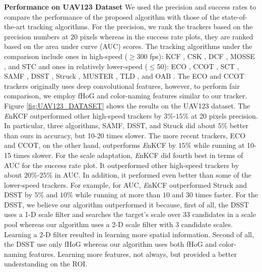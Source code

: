\documentclass[10pt,twocolumn,letterpaper]{article}
\begin{document}
\textbf{Performance on UAV123 Dataset} We used the precision and
success rates to compare the performance of the proposed algorithm
with those of the state-of-the-art tracking algorithms. For the
precision, we rank the trackers based on the precision numbers at 20
pixels whereas in the success rate plots, they are ranked based on the
area under curve (AUC) scores. The tracking algorithms under the
comparison include ones in high-speed ($\geq$300 fps): KCF
\cite{henriques2015high}, CSK \cite{henriques2012exploiting}, DCF
\cite{henriques2015high}, MOSSE \cite{bolme2010visual}, and STC
\cite{zhang2014fast} and ones in relatively lower-speed ($\leq$50):
ECO \cite{DanelljanCVPR2017}, CCOT \cite{DanelljanECCV2016}, SCT
\cite{Choi_2016_CVPR}, SAMF \cite{li2014scale}, DSST
\cite{danelljan2014accurate}, Struck \cite{hare2012efficient}, MUSTER
\cite{hong2015multi}, TLD \cite{kalal2012tracking}, and OAB
\cite{zhang2012robust}. The ECO and CCOT trackers originally uses deep
convolutional features, however, to perform fair comparison, we employ
fHoG and color-naming features similar to our tracker. Figure
\ref{fig:UAV123_DATASET} shows the results on the UAV123 dataset. The
    {\it E}nKCF outperformed other high-speed trackers by $3\%$-$15\%$
    at 20 pixels precision. In particular, three algorithms, SAMF,
    DSST, and Struck did about $5\%$ better than ours in accuracy, but
    10-20 times slower. The more recent trackers, ECO and CCOT, on the
    other hand, outperforms {\it E}nKCF by $15\%$ while running at
    10-15 times slower. For the scale adaptation, {\it E}nKCF did
    fourth best in terms of AUC for the success rate plot. It
    outperformed other high-speed trackers by about $20\%$-$25\%$ in
    AUC. In addition, it performed even better than some of the
    lower-speed trackers.  For example, for AUC, {\it E}nKCF
    outperformed Struck and DSST by $5\%$ and $10\%$ while running at
    more than $10$ and $30$ times faster. For the DSST, we believe our
    algorithm outperformed it because, first of all, the DSST uses a
    1-D scale filter and searches the target's scale over 33
    candidates in a scale pool whereas our algorithm uses a 2-D scale
    filter with 3 candidate scales. Learning a 2-D filter resulted in
    learning more spatial information. Second of all, the DSST use
    only fHoG whereas our algorithm uses both fHoG and color-naming
    features. Learning more features, not always, but provided a
    better understanding on the ROI.
    
\end{document}
